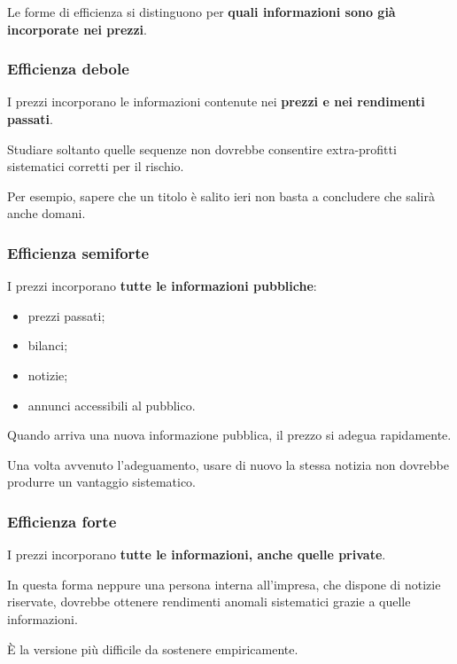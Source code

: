 \noindent Le forme di efficienza si distinguono
per \textbf{quali informazioni
sono già incorporate nei prezzi}.


\subsubsection*{Efficienza debole}

\noindent I prezzi incorporano le informazioni
contenute nei \textbf{prezzi e nei rendimenti passati}.

\noindent Studiare soltanto quelle sequenze
non dovrebbe consentire extra-profitti sistematici
corretti per il rischio.

\medskip

\noindent Per esempio, sapere che un titolo
è salito ieri non basta a concludere
che salirà anche domani.


\subsubsection*{Efficienza semiforte}

\noindent I prezzi incorporano
\textbf{tutte le informazioni pubbliche}:

\begin{itemize}
    \item prezzi passati;
    \item bilanci;
    \item notizie;
    \item annunci accessibili al pubblico.
\end{itemize}

\noindent Quando arriva una nuova informazione pubblica,
il prezzo si adegua rapidamente.

\noindent Una volta avvenuto l'adeguamento,
usare di nuovo la stessa notizia
non dovrebbe produrre un vantaggio sistematico.


\subsubsection*{Efficienza forte}

\noindent I prezzi incorporano
\textbf{tutte le informazioni,
anche quelle private}.

\noindent In questa forma neppure una persona
interna all'impresa, che dispone di notizie riservate,
dovrebbe ottenere rendimenti anomali sistematici
grazie a quelle informazioni.

\medskip

\noindent È la versione più difficile
da sostenere empiricamente.

